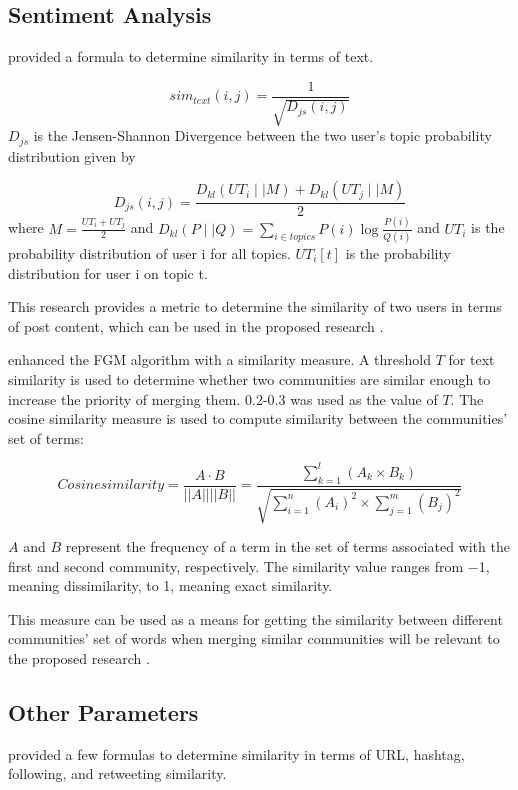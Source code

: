\subsection{Sentiment Analysis}

 provided a formula to determine similarity in terms of text. 

\begin{equation}
sim_{text}(i,j) = \frac{1}{\sqrt{D_{js}(i,j)}}
\end{equation}$D_{js}$ is the Jensen-Shannon Divergence between the two user’s topic probability distribution given by

\begin{equation}
D_{js}(i,j) = \frac{D_{kl}(UT_i \mid\mid M) + D_{kl}(UT_j \mid\mid M)}{2}
\end{equation}where $M = \frac{UT_i + UT_j}{2}$ and $D_{kl}(P \mid\mid Q) = \sum_{i \in topics} P(i) \log{\frac{P(i)}{Q(i)}}$ and $UT_i$ is the probability distribution of user i for all topics. $UT_i[t]$ is the probability distribution for user i on topic t.

This research provides a metric to determine the similarity of two users in terms of post content, which can be used in the proposed research \cite{Zhang:2012}.

 enhanced the FGM algorithm with a similarity measure. A threshold $T$ for text similarity is used to determine whether two communities are similar enough to increase the priority of merging them. 0.2-0.3 was used as the value of $T$. The cosine similarity measure is used to compute similarity between the communities' set of terms:

\begin{equation}
Cosine similarity = \frac {A \cdot B}{||A|| ||B||} = \frac {\sum_{k = 1}^{l}(A_k \times B_k)}{\sqrt{\sum_{i = 1}^{n} (A_i)^2 \times \sum_{j = 1}^{m} (B_j)^2}}
\end{equation}

$A$ and $B$ represent the frequency of a term in the set of terms associated with the first and second community, respectively. The similarity value ranges from −1, meaning dissimilarity, to 1, meaning exact similarity.

This measure can be used as a means for getting the similarity between different communities’ set of words when merging similar communities will be relevant to the proposed research \cite{Bakillah:2014}.

\subsection{Other Parameters}
 provided a few formulas to determine similarity in terms of URL, hashtag, following, and retweeting similarity.


